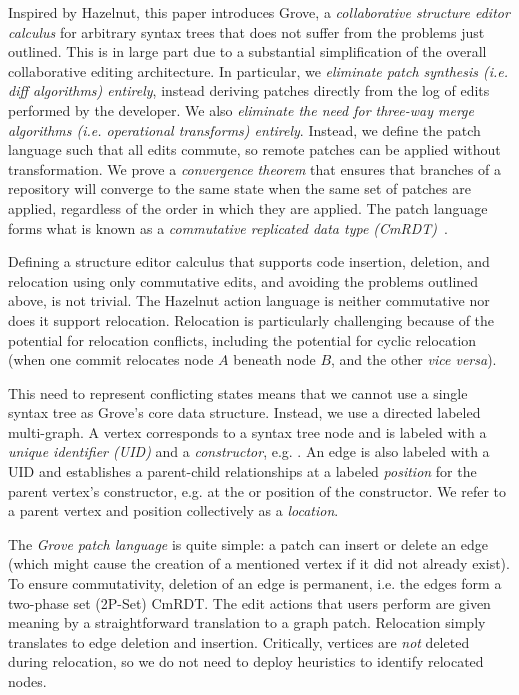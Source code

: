 Inspired by Hazelnut, this paper introduces Grove, a \emph{collaborative structure editor calculus} for arbitrary syntax trees that does not suffer from the problems just outlined. 
This is in large part due to a substantial simplification of the overall collaborative
editing architecture. In particular, we \emph{eliminate patch synthesis (i.e. diff algorithms) entirely}, 
instead deriving patches directly from the log of edits performed by the developer. 
We also \emph{eliminate the need for three-way merge algorithms (i.e. operational transforms) entirely}.
Instead, we define the patch language such that all edits commute, 
so remote patches can be applied without transformation. 
We prove a \emph{convergence theorem} that ensures that branches of a repository will converge to the same state 
when the same set of patches are applied, regardless of the order in which they are applied.
The patch language forms what is known as a \emph{commutative replicated data type (CmRDT)}~\cite{preguicca2018conflict,shapiro2011conflict}.

Defining a structure editor calculus that supports code insertion, deletion, and relocation using only commutative edits, and avoiding the problems outlined above, is not trivial. The Hazelnut action language is neither commutative nor does it support relocation. 
Relocation is particularly challenging because of the potential for relocation conflicts,
including the potential for cyclic relocation (when one commit relocates node $A$ beneath node $B$, and the other \emph{vice versa}). 

This need to represent conflicting states means that we cannot use a single syntax tree as Grove's 
core data structure. Instead, we use a directed labeled multi-graph. A vertex corresponds to a syntax tree node and is labeled with a \emph{unique identifier (UID)} and a \emph{constructor}, e.g. . An edge is also labeled with a UID and establishes a parent-child relationships at a labeled \emph{position} for the parent vertex's constructor, e.g. at the  or  position of the  constructor. We refer to a parent vertex and position collectively as a \emph{location}.

The \emph{Grove patch language} is quite simple: a patch can insert or delete an edge (which might cause the creation of a mentioned vertex if it did not already exist). 
To ensure commutativity, deletion of an edge is permanent, i.e.
the edges form a two-phase set (2P-Set) CmRDT. The edit actions that users perform are given meaning by a straightforward translation to a graph patch. 
Relocation simply translates to 
edge deletion and insertion. Critically, vertices are \emph{not} deleted during relocation,
so we do not need to deploy heuristics to identify relocated nodes.

